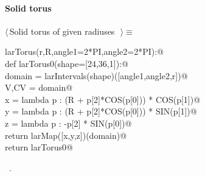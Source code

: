 \documentclass[11pt,oneside]{article}	%
\begin{document}
\paragraph{Solid torus}
\begin{flushleft} \small \label{scrap21}
$\langle\,$Solid torus of given radiuses\nobreak\ {\footnotesize {}}$\,\rangle\equiv$
\vspace{-1ex}
\begin{list}{}{} \item
\mbox{}\verb@def larTorus(r,R,angle1=2*PI,angle2=2*PI):@\\
\mbox{}\verb@   def larTorus0(shape=[24,36,1]):@\\
\mbox{}\verb@      domain = larIntervals(shape)([angle1,angle2,r])@\\
\mbox{}\verb@      V,CV = domain@\\
\mbox{}\verb@      x = lambda p : (R + p[2]*COS(p[0])) * COS(p[1])@\\
\mbox{}\verb@      y = lambda p : (R + p[2]*COS(p[0])) * SIN(p[1])@\\
\mbox{}\verb@      z = lambda p : -p[2] * SIN(p[0])@\\
\mbox{}\verb@      return larMap([x,y,z])(domain)@\\
\mbox{}\verb@   return larTorus0@\\
\mbox{}\verb@@{\NWsep}
\end{list}
\vspace{-1ex}
\footnotesize\addtolength{\baselineskip}{-1ex}
\begin{list}{}{\setlength{\itemsep}{-\parsep}\setlength{\itemindent}{-\leftmargin}}
\item \NWtxtMacroRefIn\ .
\end{list}
\end{flushleft}
\end{document}
